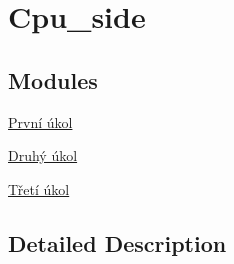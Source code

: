 \hypertarget{group__cpu__side}{\section{Cpu\-\_\-side}
\label{group__cpu__side}
}
\subsection*{Modules}
\begin{DoxyCompactItemize}
\item 
\hyperlink{group__task1}{První úkol}
\item 
\hyperlink{group__task2}{Druhý úkol}
\item 
\hyperlink{group__task3}{Třetí úkol}
\end{DoxyCompactItemize}


\subsection{Detailed Description}
